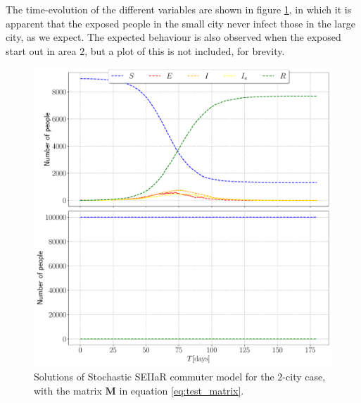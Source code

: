 The time-evolution of the different variables are shown in figure \ref{fig:test_commuter}, in which it is apparent that the exposed people in the small city never infect those in the large city, as we expect. The expected behaviour is also observed when the exposed start out in area $2$, but a plot of this is not included, for brevity. 


\begin{figure}[htb]
	\centering
	\includegraphics[width=0.8\columnwidth]{../fig/test_commuter.pdf}
	\caption{Solutions of Stochastic SEIIaR commuter model for the $2$-city case, with the matrix $\mathbf{M}$ in equation \eqref{eq:test_matrix}.}
	\label{fig:test_commuter}
\end{figure}